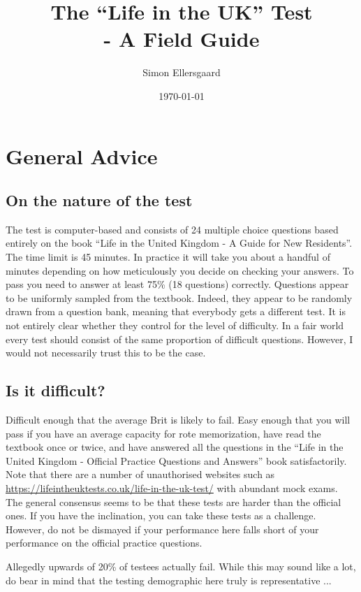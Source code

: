 \documentclass[10pt,reqno]{amsart}
\title[]{The ``Life in the UK'' Test \\ - A Field Guide}
\author{Simon Ellersgaard}
\date{\today}
\begin{document}
\maketitle


\section{General Advice}

\subsection{On the nature of the test} The test is computer-based and consists of 24 multiple choice questions based entirely on the book ``Life in the United Kingdom - A Guide for New Residents''. The time limit is 45 minutes. In practice it will take you about a handful of minutes depending on how meticulously you decide on checking your answers. To pass you need to answer at least 75\% (18 questions) correctly.
Questions appear to be uniformly sampled from the textbook. Indeed, they appear to be randomly drawn from a question bank, meaning that everybody gets a different test. 
It is not entirely clear whether they control for the level of difficulty. In a fair world every test should consist of the same proportion of difficult questions. However, I would not necessarily trust this to be the case.

\subsection{Is it difficult?} Difficult enough that the average Brit is likely to fail. Easy enough that you will pass if you have an average capacity for rote memorization, have read the textbook once or twice, and have answered all the questions in the ``Life in the United Kingdom - Official Practice Questions and Answers'' book satisfactorily. Note that there are a number of unauthorised websites such as \url{https://lifeintheuktests.co.uk/life-in-the-uk-test/} with abundant mock exams. The general consensus seems to be that these tests are harder than the official ones. If you have the inclination, you can take these tests as a challenge. However, do not be dismayed if your performance here falls short of your performance on the official practice questions.    

\hspace{5mm} Allegedly upwards of 20\% of testees actually fail. While this may sound like a lot, do bear in mind that the testing demographic here truly is representative ...
\end{document}
